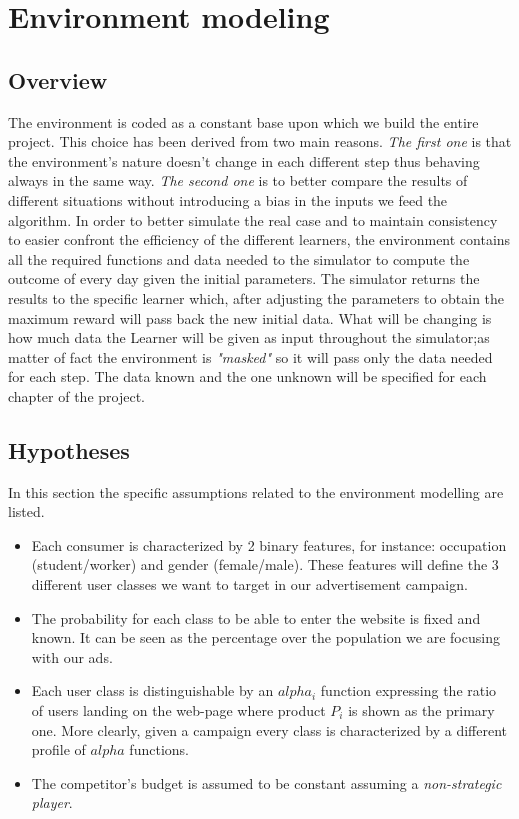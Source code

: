 \chapter{Environment modeling}

\section{Overview}
\label{chap:env_overview}

The environment is coded as a constant base upon which we build the entire project. This choice has been derived from two main reasons. \textit{The first one} is that the environment's nature doesn't change in each different step thus behaving always in the same way. \textit{The second one} is to better compare the results of different situations without introducing a bias in the inputs we feed the algorithm.
In order to better simulate the real case and to maintain consistency to easier confront the efficiency of the different learners, the environment contains all the required functions and data needed to the simulator to compute the outcome of every day given the initial parameters. The simulator returns the results to the specific learner which, after adjusting the parameters to obtain the maximum reward will pass back the new initial data.
What will be changing is how much data the Learner will be given as input throughout the simulator;as matter of fact the environment is \textit{"masked"} so it will pass only the data needed for each step. The data known and the one unknown will be specified for each chapter of the project.
\section{Hypotheses}
 \label{sec:env_hypoteses}

In this section the specific assumptions related to the environment modelling are listed.

\begin{itemize}
    \item Each consumer is characterized by 2 binary features, for instance: occupation (student/worker) and gender (female/male). These features will define the 3 different user classes we want to target in our advertisement campaign.
    \item The probability for each class to be able to enter the website is fixed and known. It can be seen as the percentage over the population we are focusing with our ads.
    \item Each user class is distinguishable by an $alpha_i$ function expressing the ratio of users landing on the web-page where product $P_i$ is shown as the primary one. More clearly, given a campaign every class is characterized by a different profile of $alpha$ functions.
    \item The competitor's budget is assumed to be constant assuming a \textit{non-strategic player}.
 \end{itemize}

